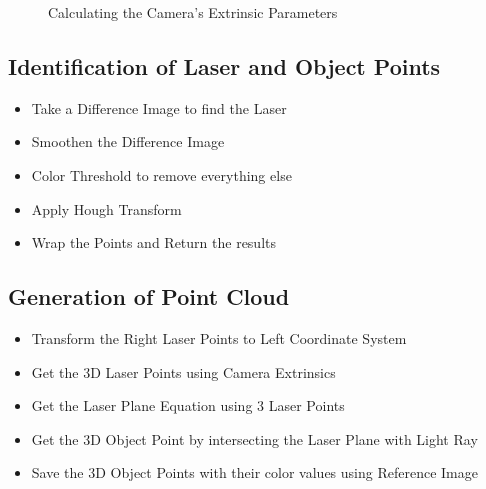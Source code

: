 \begin{figure}[bht]
\centering
{} \quad
{}
\label{figure:camera-calibration-extrinsics}
\caption{Calculating the Camera's Extrinsic Parameters}
\end{figure}

\subsection{Identification of Laser and Object Points}
\begin{itemize}
	\item Take a Difference Image to find the Laser
  \item Smoothen the Difference Image
  \item Color Threshold to remove everything else
  \item Apply Hough Transform
  \item Wrap the Points and Return the results
\end{itemize}	

\subsection{Generation of Point Cloud}
\begin{itemize}
	\item Transform the Right Laser Points to Left Coordinate System
  \item Get the 3D Laser Points using Camera Extrinsics
  \item Get the Laser Plane Equation using 3 Laser Points
  \item Get the 3D Object Point by intersecting the
				Laser Plane with Light Ray
  \item Save the 3D Object Points with their color values 
				using Reference Image
\end{itemize}	

